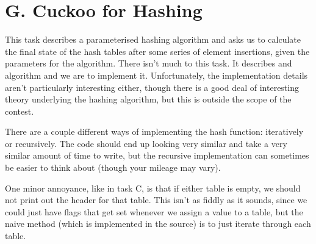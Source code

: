 \section*{G. Cuckoo for Hashing}

This task describes a parameterised hashing algorithm and asks us to calculate
the final state of the hash tables after some series of element insertions,
given the parameters for the algorithm. There isn't much to this task. It
describes and algorithm and we are to implement it. Unfortunately, the
implementation details aren't particularly interesting either, though there is
a good deal of interesting theory underlying the hashing algorithm, but this is
outside the scope of the contest.

There are a couple different ways of implementing the hash function:
iteratively or recursively. The code should end up looking very similar and
take a very similar amount of time to write, but the recursive implementation
can sometimes be easier to think about (though your mileage may vary).

One minor annoyance, like in task C, is that if either table is empty, we
should not print out the header for that table. This isn't as fiddly as it
sounds, since we could just have flags that get set whenever we assign a value
to a table, but the naive method (which is implemented in the source) is to
just iterate through each table.
